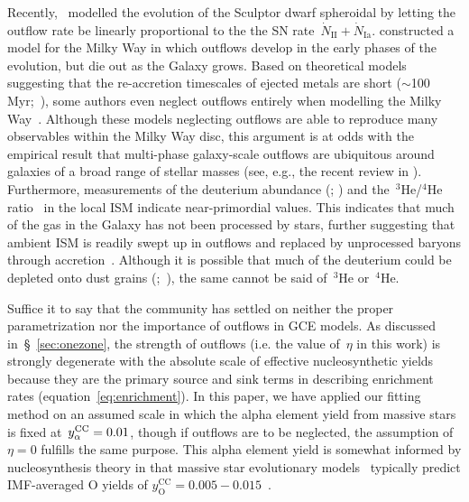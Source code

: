\documentclass[ms.tex]{subfiles}
\begin{document}
Recently,~\citet{delosReyes2022} modelled the evolution of the Sculptor dwarf
spheroidal by letting the outflow rate be linearly proportional to the the
SN rate~$\dot{N}_\text{II} + \dot{N}_\text{Ia}$.
\citet*{Kobayashi2020} constructed a model for the Milky Way in which
outflows develop in the early phases of the evolution, but die out as the
Galaxy grows.
Based on theoretical models suggesting that the re-accretion timescales of
ejected metals are short ($\sim$100 Myr;~\citealp{Melioli2008, Melioli2009,
Spitoni2008, Spitoni2009}), some authors even neglect outflows entirely when
modelling the Milky Way~\citep[e.g.][]{Minchev2013, Minchev2014, Minchev2017,
Spitoni2019, Spitoni2021}.
Although these models neglecting outflows are able to reproduce many
observables within the Milky Way disc, this argument is at odds with the
empirical result that multi-phase galaxy-scale outflows are ubiquitous around
galaxies of a broad range of stellar masses (see, e.g., the recent review in
\citealt{Veilleux2020}).
Furthermore, measurements of the deuterium abundance (\citealp{Linsky2006};
\citealp*{Prodanovic2010}) and the~$^3$He/$^4$He ratio~\citep{Balser2018} in
the local ISM indicate near-primordial values.
This indicates that much of the gas in the Galaxy has not been processed by
stars, further suggesting that ambient ISM is readily swept up in outflows and
replaced by unprocessed baryons through accretion~\citep{Weinberg2017b,
Cooke2022}.
Although it is possible that much of the deuterium could be depleted onto dust
grains (\citealp{Romano2006};~\citealp*{Steigman2007}), the same cannot be
said of~$^3$He or~$^4$He.
\par
Suffice it to say that the community has settled on neither the proper
parametrization nor the importance of outflows in GCE models.
As discussed in~\S~\ref{sec:onezone}, the strength of outflows (i.e. the value
of~$\eta$ in this work) is strongly degenerate with the absolute scale of
effective nucleosynthetic yields because they are the primary source and sink
terms in describing enrichment rates (equation~\ref{eq:enrichment}).
In this paper, we have applied our fitting method on an assumed scale in which
the alpha element yield from massive stars is fixed at~$y_\alpha^\text{CC} = 0.01$, though
if outflows are to be neglected, the assumption of~$\eta = 0$ fulfills the
same purpose.
This alpha element yield is somewhat informed by nucleosynthesis theory in that
massive star evolutionary models~\citep[e.g.][]{Nomoto2013, Sukhbold2016,
Limongi2018} typically predict IMF-averaged O yields of
$y_\text{O}^\text{CC} = 0.005 - 0.015$~\citep{Weinberg2017, Johnson2020}.
\end{document}
